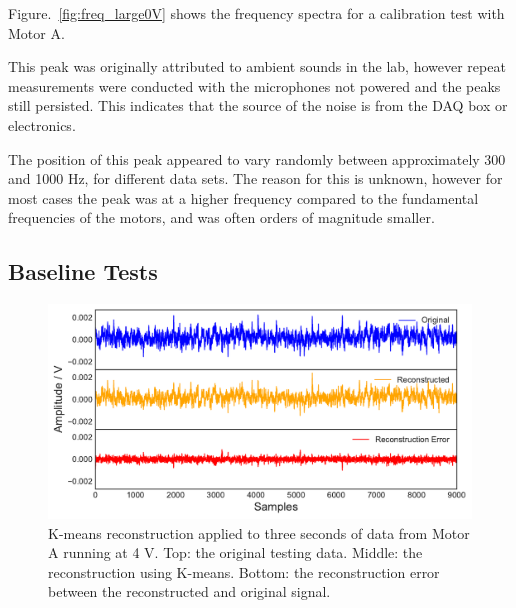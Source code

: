 Figure.~\ref{fig:freq_large0V} shows the frequency spectra for a calibration test with Motor A. 

This peak was originally attributed to ambient sounds in the lab, however repeat measurements were conducted with the microphones not powered and the peaks still persisted. This indicates that the source of the noise is from the DAQ box or electronics. 

The position of this peak appeared to vary randomly between approximately 300 and 1000 Hz, for different data sets. The reason for this is unknown, however for most cases the peak was at a higher frequency compared to the fundamental frequencies of the motors, and was often orders of magnitude smaller. 

\subsection{Baseline Tests}

\begin{figure}[t]
    \includegraphics[width=1.0\textwidth]{fig/kmeans_large_4Vnowater.pdf}
    \caption[K-means Large Motor Reconstruction No Water]{K-means reconstruction applied to three seconds of data from Motor A running at 4 V. Top: the original testing data. Middle: the reconstruction using K-means. Bottom: the reconstruction error between the reconstructed and original signal.}
    \label{fig:kmeans_large4V}
\end{figure}

